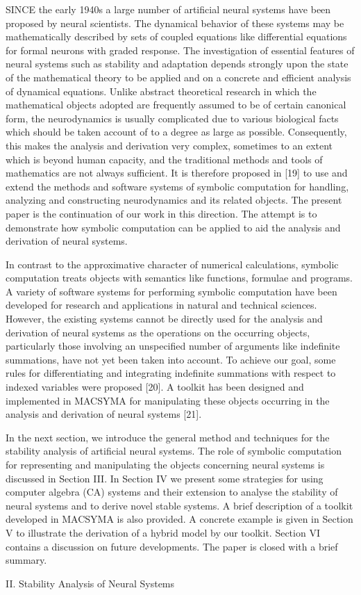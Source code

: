 \smallskip
\noindent
SINCE the early 1940s a large number of artificial neural 
systems have been 
proposed by neural scientists. The dynamical behavior of these systems
may 
be mathematically described by sets of coupled equations like
differential 
equations for formal neurons with graded response. The investigation of
essential features of neural systems such as stability and 
adaptation depends strongly upon the state of the mathematical theory to
be 
applied and on a concrete and efficient analysis of dynamical equations.
Unlike abstract theoretical research in which the mathematical objects 
adopted are frequently assumed to be of certain canonical form, 
the neurodynamics is usually complicated due to various biological facts
which should be taken account of to a degree as large as possible. 
Consequently, this makes the analysis and derivation very complex, 
sometimes to an extent which is beyond human capacity, and 
the traditional methods and tools of mathematics are not always
sufficient. 
It is therefore proposed in [19] to use and extend
the methods and software systems of symbolic 
computation for handling, analyzing and constructing neurodynamics and
its 
related objects. The present paper is the continuation of our work in
this 
direction. The attempt is to demonstrate how symbolic computation can be 
applied to aid the analysis and derivation of neural systems. 

In contrast to the approximative character of numerical calculations,
symbolic 
computation treats objects with semantics 
like functions, formulae and programs. A variety of software systems for 
performing symbolic computation have been developed for research and
applications in natural and technical sciences. However, the existing
systems cannot be directly used for the analysis and
derivation of neural systems as the operations on the occurring objects,
particularly those involving an unspecified number of arguments like
indefinite summations,
have not yet been taken into account. To achieve our goal, some 
rules for differentiating and integrating indefinite summations with
respect 
to indexed variables were proposed [20].
A toolkit has been designed and implemented in MACSYMA for manipulating 
these objects occurring in the analysis and derivation of neural systems 
[21]. 

In the next section, we introduce the general method 
and techniques for the stability analysis of 
artificial neural systems. The role of symbolic computation for
representing 
and manipulating the objects concerning neural systems is discussed in 
Section III. In Section IV we present some strategies for using 
computer algebra (CA)
systems and their extension to analyse the stability of neural 
systems and to derive novel stable systems. A brief description of a
toolkit 
developed in MACSYMA is also provided.
A concrete example is given in Section V to illustrate the derivation
of a hybrid model by our toolkit. Section VI contains a discussion on
future 
developments. The paper is closed with a brief summary.
\bigskip
\noindent    
\centerline{\sc II. Stability Analysis of Neural Systems}

